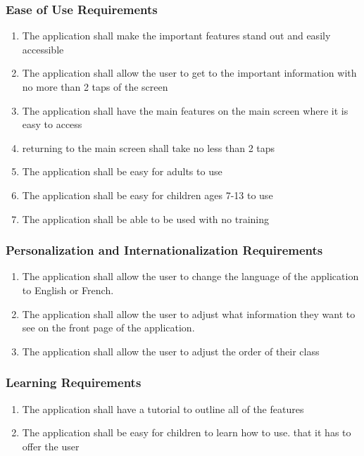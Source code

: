 \documentclass[]{article}
\begin{document}
\subsubsection{Ease of Use Requirements}
\label{ssub:ease_of_use_requirements}
\begin{enumerate}[{UH}1. ]
	\item The application shall make the important features stand out and easily
accessible
	\item The application shall allow the user to get to the important information
with no more than 2 taps of the screen
	\item The application shall have the main features on the main screen where it
is easy to access
	\item returning to the main screen shall take no less than 2 taps
	\item The application shall be easy for adults to use
	\item The application shall be easy for children ages 7-13 to use
	\item The application shall be able to be used with no training
\end{enumerate}

\subsubsection{Personalization and Internationalization Requirements}
\label{ssub:personalization_and_internationalization_requirements}
\begin{enumerate}[{UH}1. ]
	\item The application shall allow the user to change the language of the
application to English or French.
	\item The application shall allow the user to adjust what information they want
to see on
the front page of the application.
	\item The application shall allow the user to adjust the order of their class
\end{enumerate}

\subsubsection{Learning Requirements}
\label{ssub:learning_requirements}
\begin{enumerate}[{UH}1. ]
		\item The application shall have a tutorial to outline all of the features
		\item The application shall be easy for children to learn how to use.
that it has to offer the user
\end{enumerate}
\end{document}
